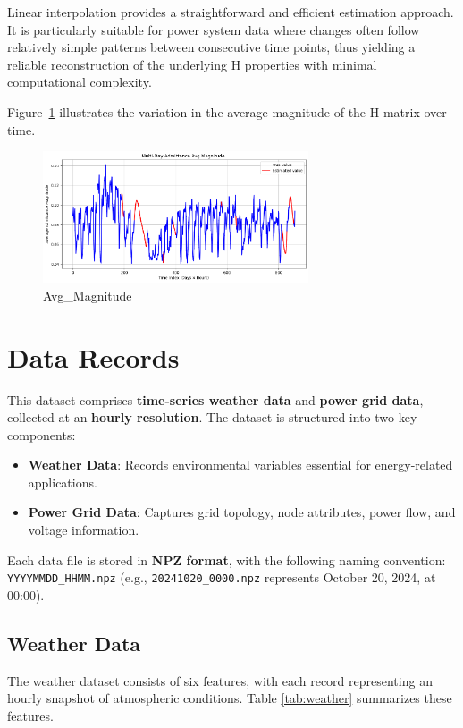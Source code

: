 \documentclass[12pt]{article}
\begin{document}
Linear interpolation provides a straightforward and efficient estimation approach. It is particularly suitable for power system data where changes often follow relatively simple patterns between consecutive time points, thus yielding a reliable reconstruction of the underlying H properties with minimal computational complexity.

Figure~\ref{fig:Avg_Magnitude} illustrates the variation in the average magnitude of the H matrix over time. 

\begin{figure}[H]
    \centering
    \includegraphics[width=0.7\textwidth]{picture/Avg_Magnitude.png}
    \caption{Avg\_Magnitude}
\label{fig:Avg_Magnitude}
\end{figure}

\newpage
\section*{Data Records}

This dataset comprises \textbf{time-series weather data} and \textbf{power grid data}, collected at an \textbf{hourly resolution}. The dataset is structured into two key components:
\begin{itemize}
    \item \textbf{Weather Data}: Records environmental variables essential for energy-related applications.
    \item \textbf{Power Grid Data}: Captures grid topology, node attributes, power flow, and voltage information.
\end{itemize}
Each data file is stored in \textbf{NPZ format}, with the following naming convention: \texttt{YYYYMMDD\_HHMM.npz} (e.g., \texttt{20241020\_0000.npz} represents October 20, 2024, at 00:00).

\subsection*{Weather Data}
The weather dataset consists of six features, with each record representing an hourly snapshot of atmospheric conditions. Table \ref{tab:weather} summarizes these features.
\end{document}
